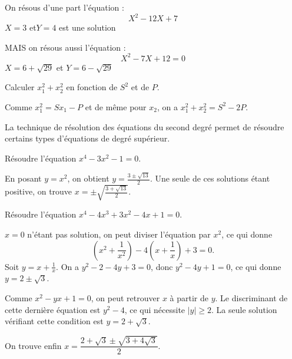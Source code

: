 \begin{sol}
On résous d'une part l'équation : $$X^2 - 12X + 7$$
$X= 3$ et$ Y=4 $ est une solution 

MAIS on résous aussi l'équation : 
$$ X^2 - 7X + 12 = 0$$
$X= 6 + \sqrt{29}$ et $Y=6 - \sqrt{29} $
\end{sol}


\begin{exo}
 Calculer $x_1^2+x_2^2$ en fonction de $S^2$ et de $P$.
\end{exo}
 
\begin{sol}
 Comme $x_1^2=Sx_1-P$ et de m\^eme pour $x_2$, on a $x_1^2+x_2^2=S^2-2P$.
\end{sol}


\par\bigskip

La technique de r\'esolution des \'equations du second degr\'e permet de r\'esoudre certains types d'\'equations de degr\'e sup\'erieur.

\begin{exo}
 R\'esoudre l'\'equation $x^4-3x^2-1=0$.
\end{exo}

\begin{sol}
En posant $y=x^2$, on obtient $y=\frac{3\pm\sqrt{13}}{2}$. Une seule de ces solutions \'etant positive, on trouve
$x=\pm\sqrt{\frac{3+\sqrt{13}}{2}}$.
\end{sol}

\begin{exo}
 R\'esoudre l'\'equation $x^4-4x^3+3x^2-4x+1=0$.
\end{exo}

\begin{sol}
 $x=0$ n'\'etant pas solution, on peut diviser l'\'equation par $x^2$, ce qui donne
$$(x^2+\frac{1}{x^2})-4(x+\frac{1}{x})+3=0.$$
Soit $y=x+\frac{1}{x}$. On a $y^2-2-4y+3=0$, donc $y^2-4y+1=0$, ce qui donne
$y=2\pm\sqrt{3}$.

Comme $x^2-yx+1=0$, on peut retrouver $x$ \`a partir de $y$. Le discriminant de cette
derni\`ere \'equation est $y^2-4$, ce qui n\'ecessite $|y|\geqslant 2$. La seule solution
v\'erifiant cette condition est $y=2+\sqrt{3}$.

On trouve enfin $x=\dfrac{2+\sqrt{3}\pm\sqrt{3+4\sqrt{3}}}{2}$.
\end{sol}
